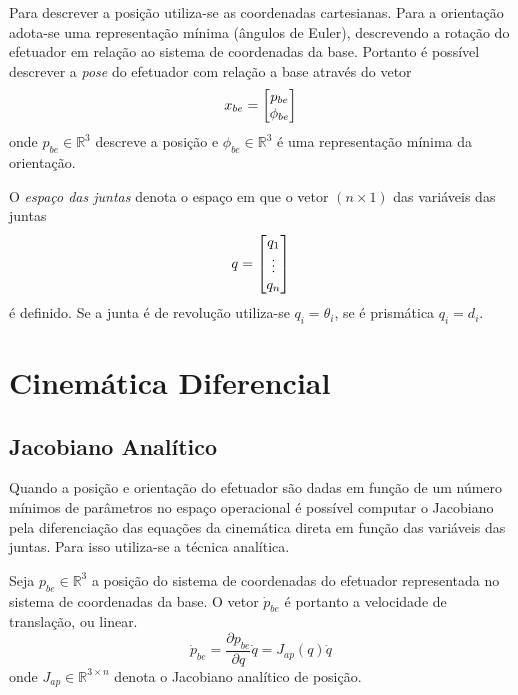 Para descrever a posição utiliza-se as coordenadas cartesianas. Para a orientação adota-se uma representação mínima (ângulos de Euler), descrevendo a rotação do efetuador em relação ao sistema de coordenadas da base. Portanto é possível descrever a \textit{pose} do efetuador com relação a base através do vetor
\begin{equation} \label{eq:op_space}
{x}_{be} = \begin{bmatrix} {p}_{be} \\ {\phi}_{be}\end{bmatrix}
\end{equation}
onde ${p}_{be} \in \mathbb{R}^3$ descreve a posição e ${\phi}_{be} \in \mathbb{R}^3$ é uma representação mínima da orientação.

O \textit{espaço das juntas} denota o espaço em que o vetor $(n \times 1)$ das variáveis das juntas
\begin{equation} \label{eq:joint_space}
{q} = \begin{bmatrix}q_1 \\ \vdots \\ q_n\end{bmatrix}
\end{equation} 
é definido. Se a junta é de revolução utiliza-se $q_i = \theta_i$, se é prismática $q_i = d_i$.

\section{Cinemática Diferencial}

\subsection{Jacobiano Analítico}
Quando a posição e orientação do efetuador são dadas em função de um número mínimos de parâmetros no espaço operacional é possível computar o Jacobiano pela diferenciação das equações da cinemática direta em função das variáveis das juntas.
Para isso utiliza-se a técnica analítica.

Seja ${p}_{be} \in \mathbb{R}^3$ a posição do sistema de coordenadas do efetuador representada no sistema de coordenadas da base. O vetor $\dot{{p}}_{be}$ é portanto a velocidade de translação, ou linear.
\begin{equation} \label{eq:jacob_pos}
\dot{{p}}_{be} = \frac{\partial {p}_{be} }{\partial {q}} {\dot{q}} = {J}_{ap} ({q}) {\dot{q}} 
\end{equation}
onde ${J}_{ap} \in \mathbb{R}^{3 \times n} $ denota o Jacobiano analítico de posição.

